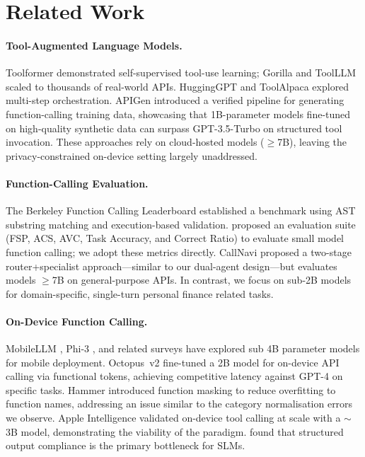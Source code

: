 \documentclass[11pt,twocolumn]{article}
\begin{document}
\section{Related Work}

\paragraph{Tool-Augmented Language Models.}
Toolformer \citep{schick2024toolformer} demonstrated self-supervised
tool-use learning; Gorilla \citep{patil2023gorilla} and ToolLLM
\citep{qin2023toolllm} scaled to thousands of real-world APIs.
HuggingGPT \citep{shen2024hugginggpt} and ToolAlpaca
\citep{tang2024toolalpaca} explored multi-step orchestration.
APIGen \citep{liu2024apigen} introduced a verified pipeline for
generating function-calling training data, showcasing that 1B-parameter
models fine-tuned on high-quality synthetic data can surpass
GPT-3.5-Turbo on structured tool invocation.
These approaches rely on cloud-hosted models ($\ge$7B), leaving the
privacy-constrained on-device setting largely unaddressed.

\paragraph{Function-Calling Evaluation.}
The Berkeley Function Calling Leaderboard \citep{yan2024bfcl}
established a benchmark using AST substring matching and
execution-based validation.
\citet{kavathekar2025small} proposed an evaluation suite (FSP, ACS,
AVC, Task Accuracy, and Correct Ratio) to evaluate small model
function calling; we adopt these metrics
directly.
CallNavi \citep{callnavi2025} proposed a two-stage router+specialist
approach---similar to our dual-agent design---but evaluates models
$\geq$7B on general-purpose APIs.
In contrast, we focus on sub-2B models for domain-specific,
single-turn personal finance related tasks.

\paragraph{On-Device Function Calling.}
MobileLLM \citep{liu2024mobilellm}, Phi-3 \citep{abdin2024phi3}, and
related surveys \citep{xu2024ondevice} have explored sub 4B parameter
models for mobile deployment.
Octopus~v2 \citep{chen2024octopus} fine-tuned a 2B model for
on-device API calling via functional tokens, achieving competitive
latency against GPT-4 on specific tasks.
Hammer \citep{lin2024hammer} introduced function masking to reduce
overfitting to function names, addressing an issue similar to the
category normalisation errors we observe.
Apple Intelligence \citep{gunter2024apple} validated on-device tool
calling at scale with a $\sim$3B model, demonstrating the viability
of the paradigm.
\citet{kavathekar2025small} found that structured output compliance is
the primary bottleneck for SLMs.
\end{document}
